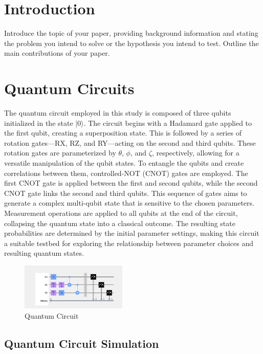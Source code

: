 \documentclass{article}
\begin{document}
\begin{multicols}{2}
\section{Introduction}
Introduce the topic of your paper, providing background information and stating the problem you intend to solve or the hypothesis you intend to test. Outline the main contributions of your paper.

\section{Quantum Circuits}

The quantum circuit employed in this study is composed of three qubits initialized in the state $|0\rangle$. The circuit begins with a Hadamard gate applied to the first qubit, creating a superposition state. This is followed by a series of rotation gates—RX, RZ, and RY—acting on the second and third qubits. These rotation gates are parameterized by $\theta$, $\phi$, and $\zeta$, respectively, allowing for a versatile manipulation of the qubit states.
To entangle the qubits and create correlations between them, controlled-NOT (CNOT) gates are employed. The first CNOT gate is applied between the first and second qubits, while the second CNOT gate links the second and third qubits. This sequence of gates aims to generate a complex multi-qubit state that is sensitive to the chosen parameters.
Measurement operations are applied to all qubits at the end of the circuit, collapsing the quantum state into a classical outcome. The resulting state probabilities are determined by the initial parameter settings, making this circuit a suitable testbed for exploring the relationship between parameter choices and resulting quantum states.

\begin{figure}[H]
    \centering
    \includegraphics[width=0.45\textwidth]{../quantum_circuit.png}
    \caption{Quantum Circuit}
    \label{fig:quantum_circuit}
\end{figure}

\subsection{Quantum Circuit Simulation}


\end{multicols}
\end{document}
